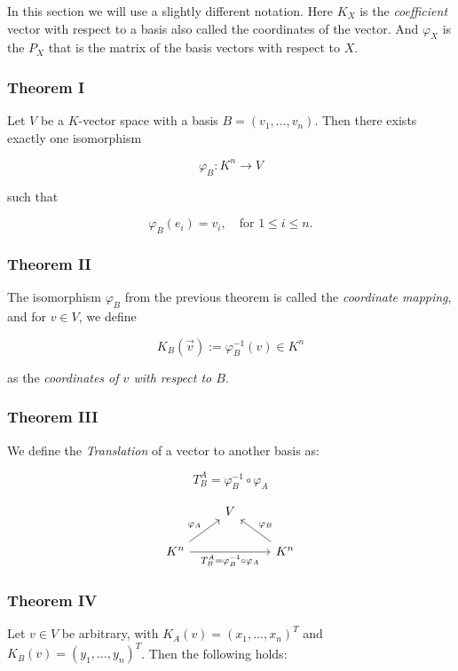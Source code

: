 In this section we will use a slightly different notation. Here \(K_X\) is 
the \emph{coefficient} vector with respect to a basis also called the coordinates
of the vector. And \(\varphi_X\) is the \(P_X\) that is the matrix of the basis vectors with
respect to \(X\).

\subsubsection{Theorem I} 

Let \( V \) be a \( K \)-vector space with a basis \( B = (v_1, \ldots, v_n) \).  
Then there exists exactly one isomorphism 

\[
    \varphi_B : K^n \to V
\]

such that

\[
    \varphi_B(e_i) = v_i, \quad \text{for } 1 \leq i \leq n.
\]

\subsubsection{Theorem II} 

The isomorphism \( \varphi_B \) from the previous theorem is called the \emph{coordinate mapping},  
and for \( v \in V \), we define

\[
    K_B (\vec{v}) := \varphi_B^{-1} (v) \in K^n
\]

as the \emph{coordinates of \( v \) with respect to \(B\)}.

\subsubsection{Theorem III} 

We define the \emph{Translation} of a vector to another basis as:

\[
    T_{B}^{A} = \varphi_{B}^{-1} \circ \varphi_A
\]

\[
    \begin{tikzcd}
    & V & \\
    K^n \arrow[ur, "\varphi_A"] \arrow[rr, "T_{B}^{A} = \varphi_B^{-1} \circ \varphi_A"'] & & K^n \arrow[ul, "\varphi_B"']
    \end{tikzcd}
\]

\subsubsection{Theorem IV} 

Let \( v \in V \) be arbitrary, with \( K_A(v) = {(x_1, \dots, x_n)}^T \) 
and \( K_B(v) = {(y_1, \dots, y_n)}^T \).  Then the following holds:

